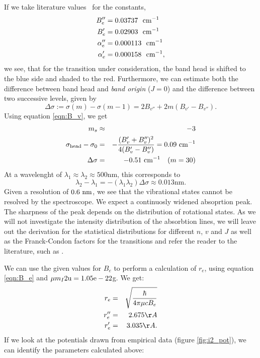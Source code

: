 If we take literature values~\cite{nist} for the constants, 
\begin{align}
    B_{e}'' &= 0.03737 \ \ \mathrm{cm^{-1}} \\ 
    B_{e}'  &= 0.02903 \ \ \mathrm{cm^{-1}} \\ 
    \alpha_{e}''  &= 0.000113 \ \ \mathrm{cm^{-1}} \\
    \alpha_{e}'  &= 0.000158 \ \ \mathrm{cm^{-1}},
\end{align}
we see, that for the transition under consideration, the band head is shifted 
to the blue side and shaded to the red. Furthermore, we can estimate both the 
difference between band head and \emph{band origin} 
($J = 0$) and the difference between two successive levels, given by
\begin{equation}
    \Delta \sigma := \sigma(m) - \sigma(m-1) = 2 B_{v''} +
    2m(B_{v'} - B_{v''}).
\end{equation}
Using equation \eqref{eqn:B_v}, we get
\begin{eqnarray}
    m_s &\approx& -3 \\
    \sigma_\mathrm{head} - \sigma_0 
        &=& - \frac{(B_v' + B_v'')^2}{4(B_v' - B_v'')} = 0.09 \ \mathrm{cm^{-1}} \\
    \Delta \sigma &=& -0.51 \ \mathrm{cm^{-1}} \quad (m = 30)
\end{eqnarray}
At a wavelenght of $\lambda_1 \approx \lambda_2 \approx 500\mathrm{nm}$, 
this corresponds to 
\begin{equation}
    \lambda_2 - \lambda_1 = -(\lambda_1 \lambda_2) \Delta \sigma \approx 0.013 \mathrm{nm}.
\end{equation}
Given a resolution of $0.6\ \mathrm{nm}$, we see that the vibrational states cannot be resolved 
by the spectroscope. We expect a continuosly widened absoprtion peak. The sharpness 
of the peak depends on the distribution of rotational states. As we will not investigate 
the intensity distribution of the absorbtion lines, we will leave out the derivation 
for the statistical distributions for different $n$, $v$ and $J$ as well as the 
Franck-Condon factors for the transitions and refer the reader to the literature, such 
as \cite{lefebvre2004spectra}. 

We can use the given values for $B_e$ to 
perform a calculation of $r_e$, using equation \eqref{eqn:B_e} and 
$\mu m_{I}\/2 \mathrm{u} = 1.05\mathrm{e}-22$g. We get:
\begin{eqnarray}
    r_e   &=& \sqrt{\frac{\hbar}{4 \pi \mu c B_e}} \label{eqn:r_e}\\
    r_e'' &=& 2.675 \AA \label{eqn:r_e0}\\
    r_e'  &=& 3.035 \AA. \label{eqn:r_e1}
\end{eqnarray}
If we look at the potentials drawn from empirical data (figure \ref{fig:i2_pot}), 
we can identify the parameters calculated above:

